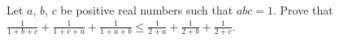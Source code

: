 Let $ a$, $ b$, $ c$ be positive real numbers such that $ abc=1$.
Prove that
$ \frac{1}{1+b+c}+\frac{1}{1+c+a}+\frac{1}{1+a+b}\leq\frac{1}{2+a}+\frac{1}{2+b}+\frac{1}{2+c}$.